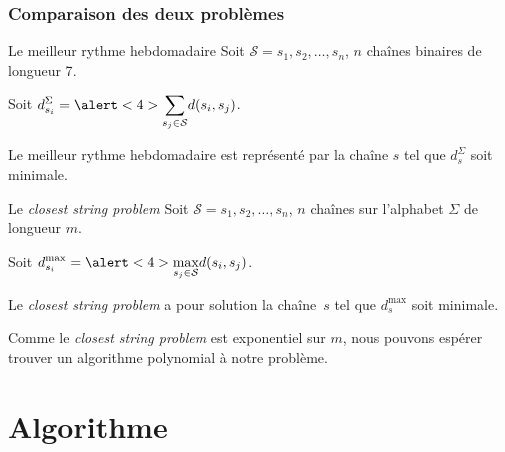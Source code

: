 \documentclass[table]{beamer}
\newcommand{\+}{\cellcolor[gray]{1}\bfseries}
\newcommand{\<}{\cellcolor[gray]{0.8}\rmfamily\itshape}
\def\S{\mathcal{S}}
\newcommand{\nologo}{\setbeamertemplate{logo}{}}
\newcommand*{\foreign}[2][english]{%
    \emph{\foreignlanguage{#1}{#2}}%
}
\begin{document}
{\nologo
\begin{frame}
  \frametitle{Comparaison des deux problèmes}

  \begin{block}{Le meilleur rythme hebdomadaire}
    Soit $\S = s_1, s_2, \ldots, s_n$, $n$ chaînes \alert<2>{binaires}
    de \alert<3>{longueur 7}.

    Soit
    \begin{math}
      \displaystyle
      d^\Sigma_{s_i} = \alert<4>{\sum_{s_j\in\S}} d(s_i, s_j)
    \end{math}.

    Le meilleur rythme hebdomadaire est représenté par la chaîne $s$
    tel que $d^\Sigma_s$ soit minimale.
  \end{block}

  \begin{block}{Le \foreign{closest string problem}}
    Soit $\S = s_1, s_2, \ldots, s_n$, $n$ chaînes \alert<2>{sur
      l'alphabet $\Sigma$} de \alert<3>{longueur $m$}.

    Soit
    \begin{math}
      \displaystyle
      d^{\max}_{s_i} = \alert<4>{\max_{s_j\in\S}} d(s_i, s_j)
    \end{math}.

    Le \emph{closest string problem} a pour solution la chaîne~$s$ tel
    que $d^{\max}_s$ soit minimale.
  \end{block}

  \pause[5] Comme le \foreign{closest string problem} est exponentiel
  sur $m$, nous pouvons espérer trouver un algorithme polynomial à
  notre problème.
\end{frame}
}

\section{Algorithme}
\end{document}
